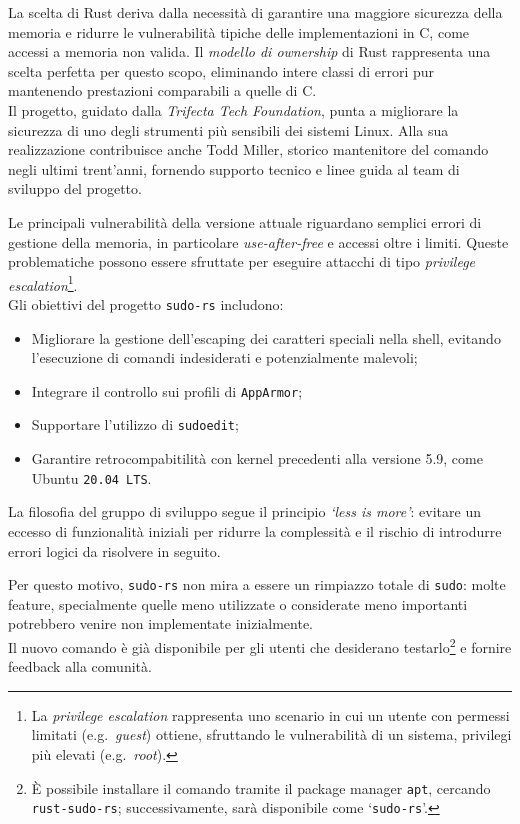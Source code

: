 La scelta di Rust deriva dalla necessità di garantire una maggiore sicurezza della memoria e ridurre le vulnerabilità
tipiche delle implementazioni in C, come accessi a memoria non valida. Il \textit{modello di ownership} di Rust 
rappresenta una scelta perfetta per questo scopo, eliminando intere classi di errori pur mantenendo prestazioni comparabili a quelle di C. \hfill
\vspace{10pt}\\
\noindent Il progetto, guidato dalla \textit{Trifecta Tech Foundation}, punta a migliorare la sicurezza di uno degli strumenti più sensibili dei sistemi Linux.
Alla sua realizzazione contribuisce anche Todd Miller, storico mantenitore del comando negli ultimi trent'anni, fornendo supporto tecnico e linee guida 
al team di sviluppo del progetto.

Le principali vulnerabilità della versione attuale riguardano semplici errori di gestione della memoria, in particolare 
\textit{use-after-free} e accessi oltre i limiti.
Queste problematiche possono essere sfruttate per eseguire attacchi di tipo \textit{privilege escalation}\footnote{La \textit{privilege escalation} rappresenta uno scenario in cui 
un utente con permessi limitati (e.g.\ \textit{guest}) ottiene, sfruttando le vulnerabilità di un sistema, privilegi più elevati (e.g.\ \textit{root}).}. \hfill
\vspace{10pt} \\
\noindent Gli obiettivi del progetto \texttt{sudo-rs} includono:
\begin{itemize}
    \item Migliorare la gestione dell'escaping dei caratteri speciali nella shell, evitando l'esecuzione di comandi indesiderati e potenzialmente malevoli;
    \item Integrare il controllo sui profili di \texttt{AppArmor};
    \item Supportare l'utilizzo di \texttt{sudoedit};
    \item Garantire retrocompabitilità con kernel precedenti alla versione 5.9, come Ubuntu \texttt{20.04 LTS}.\ 
\end{itemize}
La filosofia del gruppo di sviluppo segue il principio \textit{`less is more'}: evitare un eccesso di funzionalità iniziali per ridurre la complessità e il rischio di
introdurre errori logici da risolvere in seguito.

Per questo motivo, \texttt{sudo-rs} non mira a essere un rimpiazzo totale di \texttt{sudo}: molte feature, specialmente quelle meno utilizzate o considerate meno importanti potrebbero venire non implementate inizialmente. \hfill
\vspace{7pt} \\
\noindent Il nuovo comando è già disponibile per gli utenti che desiderano testarlo\footnote{È possibile installare il comando tramite il package manager \texttt{apt}, cercando \texttt{rust-sudo-rs}; successivamente, sarà disponibile come `\texttt{sudo-rs}'.} e fornire feedback alla comunità.

